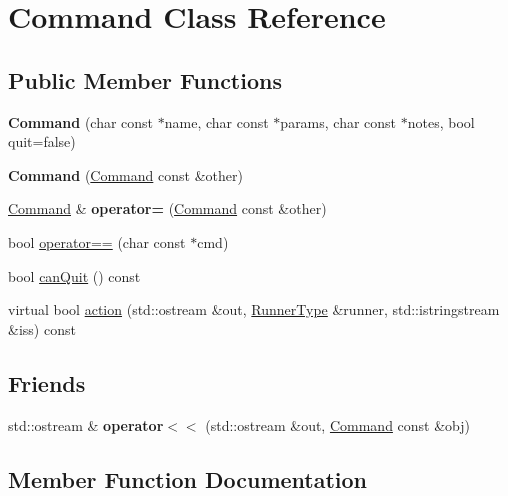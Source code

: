 \hypertarget{classCommand}{}\section{Command Class Reference}
\label{classCommand}
\subsection*{Public Member Functions}
\begin{DoxyCompactItemize}
\item 
\mbox{\label{classCommand_ac26b14828c5a72f9bd370421a4788b5d}} 
{\bfseries Command} (char const $\ast$name, char const $\ast$params, char const $\ast$notes, bool quit=false)
\item 
\mbox{\label{classCommand_a8ccab91a784c447f628ee8fec3873494}} 
{\bfseries Command} (\hyperlink{classCommand}{Command} const \&other)
\item 
\mbox{\label{classCommand_a378451c967b9d585492a778bab58f803}} 
\hyperlink{classCommand}{Command} \& {\bfseries operator=} (\hyperlink{classCommand}{Command} const \&other)
\item 
bool \hyperlink{classCommand_a75d6d67687c9d29e47ce9e80540bbd1e}{operator==} (char const $\ast$cmd)
\item 
bool \hyperlink{classCommand_a0ec10c9753786caf083aba08cf85afb0}{can\+Quit} () const
\item 
virtual bool \hyperlink{classCommand_ac423f5674fc858c0cc42f494943bc0d0}{action} (std\+::ostream \&out, \hyperlink{classProgram}{Runner\+Type} \&runner, std\+::istringstream \&iss) const
\end{DoxyCompactItemize}
\subsection*{Friends}
\begin{DoxyCompactItemize}
\item 
\mbox{\label{classCommand_a0a193e228644a3735c309d8b2b5b9899}} 
std\+::ostream \& {\bfseries operator$<$$<$} (std\+::ostream \&out, \hyperlink{classCommand}{Command} const \&obj)
\end{DoxyCompactItemize}


\subsection{Member Function Documentation}
\mbox{\label{classCommand_ac423f5674fc858c0cc42f494943bc0d0}} 

